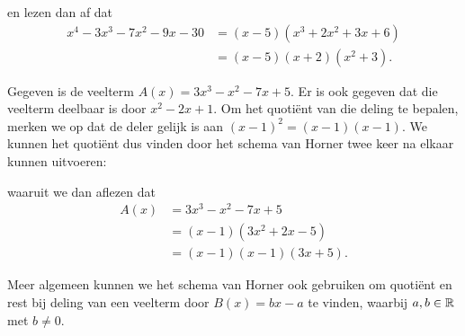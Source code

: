 \documentclass{ximera}
\begin{document}

en lezen dan af dat  
\begin{align*}
x^4 - 3x^3 - 7x^2 - 9 x - 30 
& = (x-5)(x^3 + 2x^2 + 3x + 6) \\
& = (x-5)(x+2)(x^2+3).
\end{align*}

\begin{example} 
Gegeven is de veelterm $A(x) = 3 x^3 - x^2 - 7 x + 5$. Er is ook gegeven dat die veelterm deelbaar is door $x^2-2x+1$. Om het quotiënt van die deling te bepalen, merken we op dat de deler gelijk is aan $(x-1)^2 = (x-1)(x-1)$. We kunnen het quotiënt dus vinden door het schema van Horner twee keer na elkaar kunnen uitvoeren:
\renewcommand{\kolbreed}{\widthof{$-30$}}


waaruit we dan aflezen dat 
\begin{align*}
A(x) 
& = 3x^3 - x^2 - 7x + 5 \\
& = (x-1)(3x^2+2x-5) \\
& = (x-1)(x-1)(3x+5).
\end{align*}
\end{example} 

Meer algemeen kunnen we het schema van Horner ook gebruiken om quotiënt en rest bij deling van een veelterm door $B(x) = bx-a$ te vinden, waarbij $a,b \in \mathbb{R}$ met $b \neq 0$. 
\end{document}
